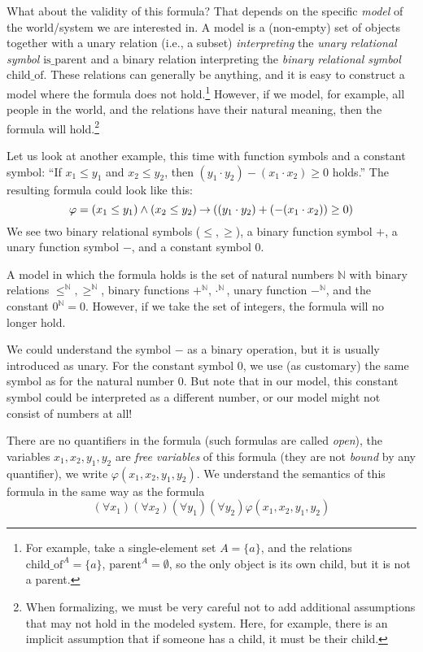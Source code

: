 What about the validity of this formula? That depends on the specific \emph{model} of the world/system we are interested in. A model is a (non-empty) set of objects together with a unary relation (i.e., a subset) \emph{interpreting} the \emph{unary relational symbol} $\mathrm{is\_parent}$ and a binary relation interpreting the \emph{binary relational symbol} $\mathrm{child\_of}$. These relations can generally be anything, and it is easy to construct a model where the formula does not hold.\footnote{For example, take a single-element set $A=\{a\}$, and the relations $\mathrm{child\_of}^A=\{a\}$, $\mathrm{parent}^A=\emptyset$, so the only object is its own child, but it is not a parent.} However, if we model, for example, all people in the world, and the relations have their natural meaning, then the formula will hold.\footnote{When formalizing, we must be very careful not to add additional assumptions that may not hold in the modeled system. Here, for example, there is an implicit assumption that if someone has a child, it must be their child.}

Let us look at another example, this time with function symbols and a constant symbol: ``If $x_1\leq y_1$ and $x_2\leq y_2$, then $(y_1 \cdot y_2)-(x_1\cdot x_2)\geq 0$ holds.'' The resulting formula could look like this:
$$
\varphi=(x_1\leq y_1)\land (x_2\leq y_2)\mathbin{\rightarrow} ((y_1 \cdot y_2)+(-(x_1\cdot x_2))\geq 0)
$$
We see two binary relational symbols ($\leq,\geq$), a binary function symbol $+$, a unary function symbol $-$, and a constant symbol $0$. 

A model in which the formula holds is the set of natural numbers $\mathbb N$ with binary relations $\leq^\mathbb N,\geq^\mathbb N$, binary functions $+^\mathbb N,\cdot^\mathbb N$, unary function $-^\mathbb N$, and the constant $0^\mathbb N=0$. However, if we take the set of integers, the formula will no longer hold.

\begin{remark}
We could understand the symbol $-$ as a binary operation, but it is usually introduced as unary. For the constant symbol $0$, we use (as customary) the same symbol as for the natural number 0. But note that in our model, this constant symbol could be interpreted as a different number, or our model might not consist of numbers at all!
\end{remark}

There are no quantifiers in the formula (such formulas are called \emph{open}), the variables $x_1,x_2,y_1,y_2$ are \emph{free variables} of this formula (they are not \emph{bound} by any quantifier), we write $\varphi(x_1,x_2,y_1,y_2)$. We understand the semantics of this formula in the same way as the formula
$$
(\forall x_1)(\forall x_2)(\forall y_1)(\forall y_2)\varphi(x_1,x_2,y_1,y_2)
$$

